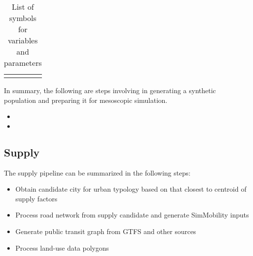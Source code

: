 \documentclass[11pt,twoside]{article}
\numberwithin{equation}{section}
\newcommand{\?}{\stackrel{?}{=}}
\begin{document}
\begin{table}[h!]
  \centering
  \begin{tabular}{l l l}
    &&
  \end{tabular}
  \caption{List of symbols for variables and parameters}
  \label{tab:symbols}
\end{table}






In summary, the following are steps involving in generating a synthetic population and preparing it for mesoscopic simulation.
\begin{itemize}
\item 
\item 
\end{itemize}

\subsection{Supply}
The supply pipeline can be summarized in the following steps:
\begin{itemize}
\item Obtain candidate city for urban typology based on that closest to centroid of supply factors
\item Process road network from supply candidate and generate SimMobility inputs
\item Generate public transit graph from GTFS and other sources
\item Process land-use data polygons
\end{itemize}
\end{document}
